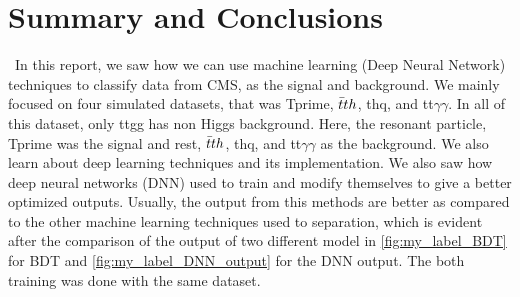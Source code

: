 \chapter{\label{summary}Summary and Conclusions}\
In this report, we saw how we can use machine learning (Deep Neural Network) techniques to classify data from CMS, as the signal and background. We mainly focused on four simulated datasets, that was Tprime, $\Bar{t}th$, thq, and tt$\gamma \gamma$. In all of this dataset, only ttgg has non Higgs background. Here, the resonant particle, Tprime was the signal and rest, $\Bar{t}th$, thq, and tt$\gamma \gamma$ as the background. We also learn about deep learning techniques and its implementation. We also saw how deep neural networks (DNN) used to train and modify themselves to give a better optimized outputs. Usually, the output from this methods are better as compared to the other machine learning techniques used to separation, which is evident after the comparison of the output of two different model in \autoref{fig:my_label_BDT} for BDT and \autoref{fig:my_label_DNN_output} for the DNN output. The both training was done with the same dataset.\\

